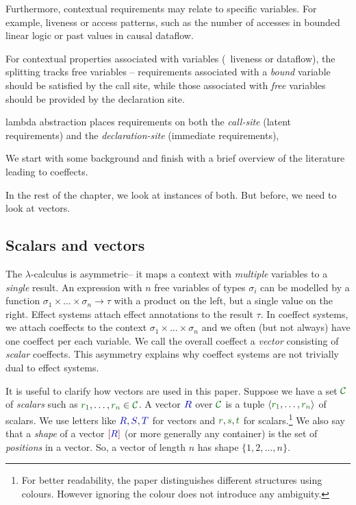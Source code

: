Furthermore, contextual requirements may relate to 
specific variables. For example, liveness or access patterns, such as the number of accesses in 
bounded linear logic or past values in causal dataflow.

For contextual properties associated with 
variables (\eg~liveness or dataflow), the splitting tracks free variables -- requirements associated 
with a \emph{bound} variable should be satisfied by the call site, while those associated with 
\emph{free} variables should be provided by the declaration site.

lambda abstraction places 
requirements on both the \emph{call-site} (latent requirements) and the \emph{declaration-site} 
(immediate requirements), 

 We start with some background and finish with a brief overview of the literature leading to coeffects.

In the rest of the chapter, we look at instances of both. But before, we need to look at vectors.


\subsection{Scalars and vectors}

The $\lambda$-calculus is asymmetric-- it maps a context with \emph{multiple} variables to a 
\emph{single} result. An expression with $n$ free variables of types $\sigma_i$ can be modelled
by a function
$\sigma_1 \times \ldots \times \sigma_n \rightarrow \tau$ with a product on the left, but a single value
on the right. Effect systems attach effect annotations to the result $\tau$. In coeffect systems,
we attach coeffects to the context $\sigma_1 \times \ldots \times \sigma_n$ and we often (but not always)
have one coeffect per each variable. We call the overall coeffect a \emph{vector} consisting of
\emph{scalar} coeffects. This asymmetry explains why coeffect systems are not trivially dual to 
effect systems.

It is useful to clarify how vectors are used in this paper. Suppose we have a set $\C$ of
\emph{scalars} such as $\cclrd{r_1},\ldots,\cclrd{r_n} \in \C$. A vector $\aclrd{R}$ over $\C$
is a tuple $\langle \cclrd{r_1}, \ldots, \cclrd{r_n}\rangle$ of scalars. 
We use letters like $\aclrd{R}, \aclrd{S}, \aclrd{T}$ for 
vectors and $\cclrd{r},\cclrd{s},\cclrd{t}$ for scalars.\footnote{For better readability, the paper 
distinguishes different structures using colours. However ignoring the colour does not introduce 
any ambiguity.} We also say that a \emph{shape} of a vector $\slift{\aclrd{R}}$ (or more generally any container) 
is the set of \emph{positions} in a vector. So, a vector of length
$n$ has shape $\{ 1, 2, \ldots, n \}$. 

